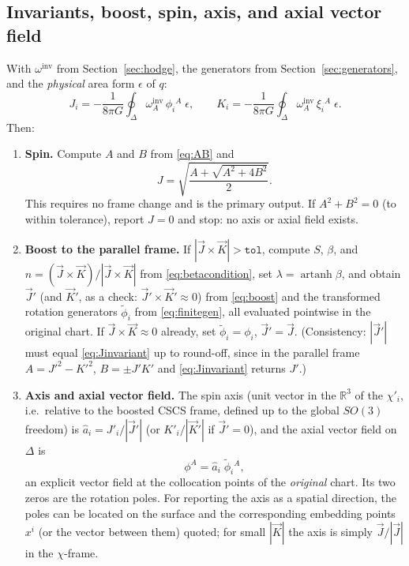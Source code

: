 \documentclass[11pt]{article}
\newcommand{\vJ}{\vec{J}}
\newcommand{\vK}{\vec{K}}
\newcommand{\vn}{\hat{n}}
\newcommand{\artanh}{\operatorname{artanh}}
\begin{document}
\subsection{Invariants, boost, spin, axis, and axial vector field}
\label{sec:invariants}

With $\omega^{\mathrm{inv}}$ from Section~\ref{sec:hodge}, the generators
from Section~\ref{sec:generators}, and the \emph{physical} area form
$\epsilon$ of $q$:
\begin{equation}
  J_i = -\frac{1}{8\pi G}\oint_\Delta
        \omega^{\mathrm{inv}}_A\,\phi_i{}^A\;\epsilon,
  \qquad
  K_i = -\frac{1}{8\pi G}\oint_\Delta
        \omega^{\mathrm{inv}}_A\,\xi_i{}^A\;\epsilon .
  \label{eq:JKeval}
\end{equation}
Then:
\begin{enumerate}
\item \textbf{Spin.}  Compute $A$ and $B$ from \eqref{eq:AB} and
  \begin{equation}
    J = \sqrt{\frac{A+\sqrt{A^2+4B^2}}{2}} .
  \end{equation}
  This requires no frame change and is the primary output.  If
  $A^2+B^2 = 0$ (to within tolerance), report $J=0$ and stop: no axis or
  axial field exists.
\item \textbf{Boost to the parallel frame.}  If
  $|\vJ\times\vK| > \texttt{tol}$, compute $S$, $\beta$, and $\vn =
  (\vJ\times\vK)/|\vJ\times\vK|$ from \eqref{eq:betacondition}, set
  $\lambda = \artanh\beta$, and obtain $\vJ'$ (and $\vK'$, as a check:
  $\vJ'\times\vK' \approx 0$) from \eqref{eq:boost} and the transformed
  rotation generators $\tilde\phi_i$ from \eqref{eq:finitegen}, all evaluated
  pointwise in the original chart.  If $\vJ\times\vK \approx 0$ already, set
  $\tilde\phi_i = \phi_i$, $\vJ' = \vJ$.  (Consistency: $|\vJ'|$ must equal
  \eqref{eq:Jinvariant} up to round-off, since in the parallel frame
  $A = J'^2 - K'^2$, $B = \pm J'K'$ and \eqref{eq:Jinvariant} returns
  $J'$.)
\item \textbf{Axis and axial vector field.}  The spin axis (unit vector in
  the $\mathbb{R}^3$ of the $\chi'_i$, i.e.\ relative to the boosted CSCS
  frame, defined up to the global $SO(3)$ freedom) is
  $\hat a_i = J'_i/|\vJ'|$ (or $K'_i/|\vK'|$ if $\vJ'=0$), and the axial
  vector field on $\Delta$ is
  \begin{equation}
    \phi^A = \hat a_i\;\tilde\phi_i{}^A ,
  \end{equation}
  an explicit vector field at the collocation points of the \emph{original}
  chart.  Its two zeros are the rotation poles.  For reporting the axis as a
  spatial direction, the poles can be located on the surface and the
  corresponding embedding points $x^i$ (or the vector between them) quoted;
  for small $|\vK|$ the axis is simply $\vJ/|\vJ|$ in the $\chi$-frame.
\end{enumerate}
\end{document}
